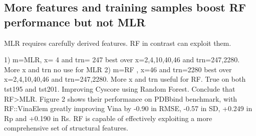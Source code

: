 \documentclass[journal=jacsat,manuscript=article]{achemso}
\begin{document}
\subsection{More features and training samples boost RF performance but not MLR}

MLR requires carefully derived features. RF in contrast can exploit them.

1) m=MLR, x= 4 and trn= 247 best over x={2,4,10,40,46} and trn={247,2280}. More x and trn no use for MLR
2) m=RF , x=46 and trn=2280 best over x={2,4,10,40,46} and trn={247,2280}. More x and trn useful for RF.
True on both tst195 and tst201.
Improving Cyscore using Random Forest. Conclude that RF>MLR.
Figure 2 shows their performance on PDBbind benchmark, with RF::VinaElem greatly improving Vina by -0.90 in RMSE, -0.57 in SD, +0.249 in Rp and +0.190 in Rs.
RF is capable of effectively exploiting a more comprehensive set of structural features.
\end{document}
